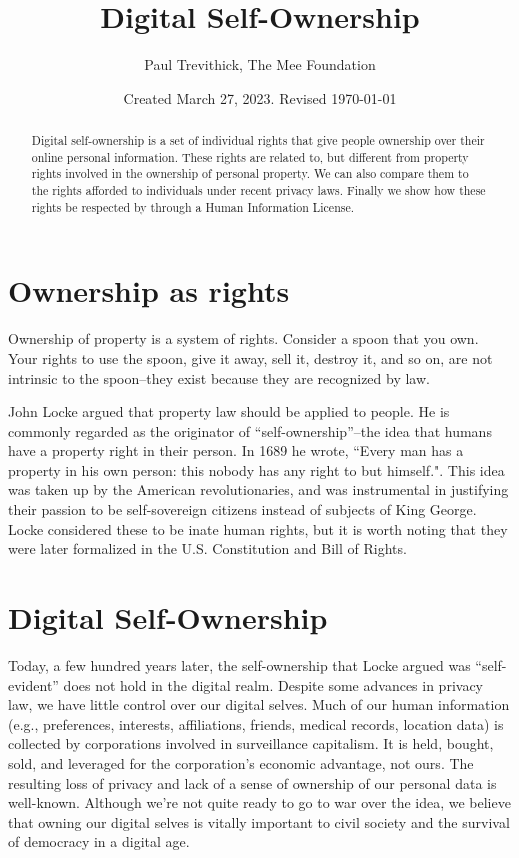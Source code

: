\documentclass[11pt, oneside]{article}   	%
\title{Digital Self-Ownership}
\author{Paul Trevithick, The Mee Foundation}
\date{Created March 27, 2023. Revised \today}
\begin{document}
\maketitle
\begin{abstract}
	Digital self-ownership is a set of individual rights that give people ownership over their online personal information. These rights are related to, but different from property rights involved in the ownership of personal property. We can also compare them to the rights afforded to individuals under recent privacy laws. Finally we show how these rights be respected by through a Human Information License.
\end{abstract}

\section{Ownership as rights}
Ownership of property is a system of rights. Consider a spoon that you own. Your rights to use the spoon, give it away, sell it, destroy it, and so on, are not intrinsic to the spoon--they exist because they are recognized by law.

John Locke argued that property law should be applied to people. He is commonly regarded as the originator of ``self-ownership''--the idea that humans have a property right in their person. In 1689 he wrote, ``Every man has a property in his own person: this nobody has any right to but himself."\cite{Locke1689}. This idea was taken up by the American revolutionaries, and was instrumental in justifying their passion to be self-sovereign citizens instead of subjects of King George. Locke considered these to be inate human rights, but it is worth noting that they were later formalized in the U.S. Constitution and Bill of Rights. 

\section{Digital Self-Ownership}

Today, a few hundred years later, the self-ownership that Locke argued was “self-evident” does not hold in the digital realm. Despite some advances in privacy law, we have little control over our digital selves. Much of our human information (e.g., preferences, interests, affiliations, friends, medical records, location data) is collected by corporations involved in surveillance capitalism\cite{zuboff2019}. It is held, bought, sold, and leveraged for the corporation’s economic advantage, not ours. The resulting loss of privacy and lack of a sense of ownership of our personal data is well-known. Although we're not quite ready to go to war over the idea, we believe that owning our digital selves is vitally important to civil society and the survival of democracy in a digital age. 
\end{document}

